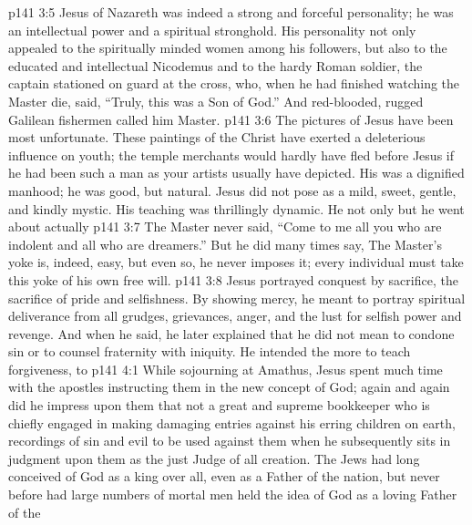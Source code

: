 \vs p141 3:5 Jesus of Nazareth was indeed a strong and forceful personality; he was an intellectual power and a spiritual stronghold. His personality not only appealed to the spiritually minded women among his followers, but also to the educated and intellectual Nicodemus and to the hardy Roman soldier, the captain stationed on guard at the cross, who, when he had finished watching the Master die, said, “Truly, this was a Son of God.” And red\hyp{}blooded, rugged Galilean fishermen called him Master.
\vs p141 3:6 The pictures of Jesus have been most unfortunate. These paintings of the Christ have exerted a deleterious influence on youth; the temple merchants would hardly have fled before Jesus if he had been such a man as your artists usually have depicted. His was a dignified manhood; he was good, but natural. Jesus did not pose as a mild, sweet, gentle, and kindly mystic. His teaching was thrillingly dynamic. He not only  but he went about actually 
\vs p141 3:7 The Master never said, “Come to me all you who are indolent and all who are dreamers.” But he did many times say,  The Master’s yoke is, indeed, easy, but even so, he never imposes it; every individual must take this yoke of his own free will.
\vs p141 3:8 Jesus portrayed conquest by sacrifice, the sacrifice of pride and selfishness. By showing mercy, he meant to portray spiritual deliverance from all grudges, grievances, anger, and the lust for selfish power and revenge. And when he said,  he later explained that he did not mean to condone sin or to counsel fraternity with iniquity. He intended the more to teach forgiveness, to 
\vs p141 4:1 While sojourning at Amathus, Jesus spent much time with the apostles instructing them in the new concept of God; again and again did he impress upon them that  not a great and supreme bookkeeper who is chiefly engaged in making damaging entries against his erring children on earth, recordings of sin and evil to be used against them when he subsequently sits in judgment upon them as the just Judge of all creation. The Jews had long conceived of God as a king over all, even as a Father of the nation, but never before had large numbers of mortal men held the idea of God as a loving Father of the 
